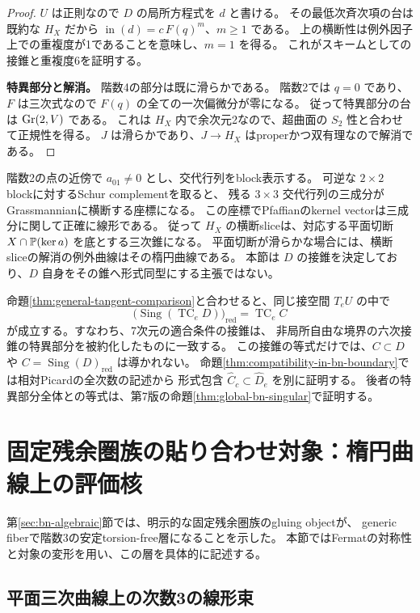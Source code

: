 \begin{proof}
$U$ は正則なので $D$ の局所方程式を $d$ と書ける。
その最低次斉次項の台は既約な $H_X$ だから
$\operatorname{in}(d)=c\,F(q)^m$、$m\ge1$ である。
上の横断性は例外因子上での重複度が1であることを意味し、$m=1$ を得る。
これがスキームとしての接錐と重複度6を証明する。

\textbf{特異部分と解消。}
階数4の部分は既に滑らかである。
階数2では $q=0$ であり、$F$ は三次式なので $F(q)$ の全ての一次偏微分が零になる。
従って特異部分の台は $\operatorname{Gr}(2,V)$ である。
これは $H_X$ 内で余次元2なので、超曲面の $S_2$ 性と合わせて正規性を得る。
$J$ は滑らかであり、$J\to H_X$ はproperかつ双有理なので解消である。
\end{proof}

\begin{remark}[横断的な三次錐]
階数2の点の近傍で $a_{01}\ne0$ とし、交代行列をblock表示する。
可逆な $2\times2$ blockに対するSchur complementを取ると、
残る $3\times3$ 交代行列の三成分がGrassmannianに横断する座標になる。
この座標でPfaffianのkernel vectorは三成分に関して正確に線形である。
従って $H_X$ の横断sliceは、対応する平面切断
$X\cap\mathbb P(\ker a)$ を底とする三次錐になる。
平面切断が滑らかな場合には、横断sliceの解消の例外曲線はその楕円曲線である。
本節は $D$ の接錐を決定しており、$D$ 自身をその錐へ形式同型にする主張ではない。
\end{remark}

命題\ref{thm:general-tangent-comparison}と合わせると、同じ接空間 $T_eU$ の中で
\[
 \bigl(\operatorname{Sing}(\operatorname{TC}_eD)\bigr)_{\mathrm{red}}
                  =\operatorname{TC}_eC
\]
が成立する。すなわち、7次元の適合条件の接錐は、
非局所自由な境界の六次接錐の特異部分を被約化したものに一致する。
この接錐の等式だけでは、$C\subset D$ や
$C=\operatorname{Sing}(D)_{\mathrm{red}}$ は導かれない。
命題\ref{thm:compatibility-in-bn-boundary}では相対Picardの全次数の記述から
形式包含 $\widehat C_c\subset\widehat D_e$ を別に証明する。
後者の特異部分全体との等式は、第7版の命題\ref{thm:global-bn-singular}で証明する。


\section{固定残余圏族の貼り合わせ対象：楕円曲線上の評価核}\label{sec:evaluation-gluing}

第\ref{sec:bn-algebraic}節では、明示的な固定残余圏族のgluing objectが、
generic fiberで階数3の安定torsion-free層になることを示した。
本節ではFermatの対称性と対象の変形を用い、この層を具体的に記述する。

\subsection{平面三次曲線上の次数3の線形束}

